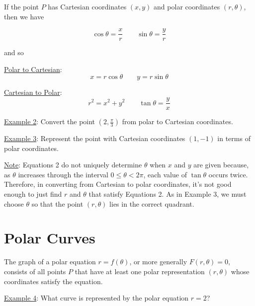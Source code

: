 \documentclass[paper=a4, fontsize=11pt]{scrartcl} %
\numberwithin{equation}{section} %
\numberwithin{figure}{section} %
\numberwithin{table}{section} %
\newcommand{\ds}{\displaystyle}
\begin{document}
If the point $P$ has Cartesian coordinates $(x,y)$ and polar coordinates $(r,\theta)$, then we have

\[\cos\theta = \ds\frac{x}{r} \quad \quad \sin\theta = \ds\frac{y}{r}\]


and so\\
\indent

\underline{Polar to Cartesian}:
\begin{equation}
\boxed{\text{ } x = r\cos\theta \quad \quad y = r\sin\theta \text{ }} \label{(1)}
\end{equation}

\underline{Cartesian to Polar}:
\begin{equation}
\boxed{\text{ } r^2 = x^2 + y^2 \quad \quad \tan\theta = \ds\frac{y}{x}\text{ }} \label{(2)}
\end{equation}
\indent

\vspace{.5in}
\underline{Example 2}: Convert the point $(2,\ds\frac{\pi}{3})$ from polar to Cartesian coordinates.\\
\indent

\vspace{1.75in}

\underline{Example 3}: Represent the point with Cartesian coordinates $(1,-1)$ in terms of polar coordinates.\\
\indent

\vspace{1.9in}

\underline{Note}: Equations 2 do not uniquely determine $\theta$ when $x$ and $y$ are given because, as $\theta$ increases through the interval $0\leq \theta < 2\pi$, each value of $\tan\theta$ occurs twice. Therefore, in converting from Cartesian to polar coordinates, it's not good enough to just find $r$ and $\theta$ that satisfy Equations 2. As in Example 3, we must choose $\theta$ so that the point $(r,\theta)$ lies in the correct quadrant.

\section*{Polar Curves}

The graph of a polar equation $r=f(\theta)$, or more generally $F(r,\theta) = 0$, consists of all points $P$ that have at least one polar representation $(r,\theta)$ whose coordinates satisfy the equation.\\
\indent

\underline{Example 4}: What curve is represented by the polar equation $r=2$?\\
\indent
\end{document}
